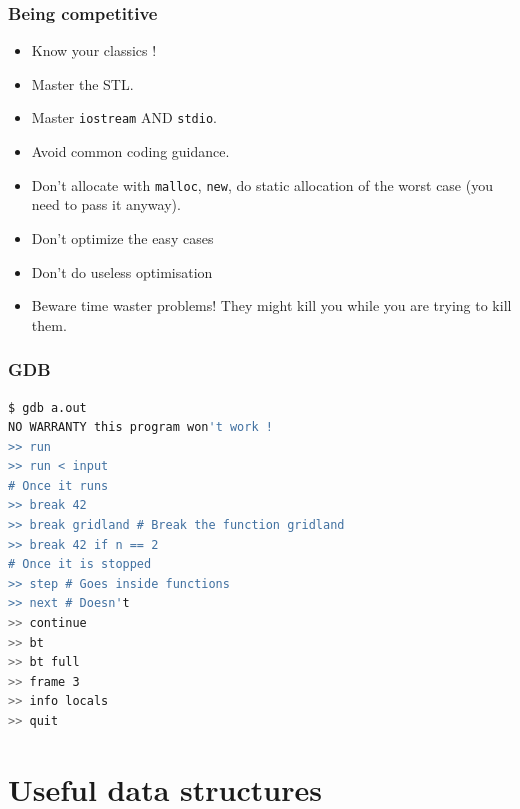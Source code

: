 \documentclass[10pt,svgnames,usenames,table]{beamer} %
\begin{document}
\begin{frame}
  \frametitle{Being competitive}
  \begin{itemize}
    \item Know your classics !
    \item Master the STL.
    \item Master \lstinline|iostream| AND \lstinline|stdio|.
    \item Avoid common coding guidance.
    \item Don't allocate with \lstinline|malloc|, \lstinline|new|,
      do static allocation of the worst case (you need to pass it anyway).
    \item Don't optimize the easy cases
    \item Don't do useless optimisation
    \item Beware time waster problems! They might kill you while you are trying to kill them.
  \end{itemize}
\end{frame}

\begin{frame}[fragile]
  \frametitle{GDB}
  \begin{lstlisting}[language=sh]
$ gdb a.out
NO WARRANTY this program won't work !
>> run
>> run < input
# Once it runs
>> break 42
>> break gridland # Break the function gridland
>> break 42 if n == 2
# Once it is stopped
>> step # Goes inside functions
>> next # Doesn't
>> continue
>> bt
>> bt full
>> frame 3
>> info locals
>> quit
  \end{lstlisting}
\end{frame}

\section{Useful data structures}
\end{document}
